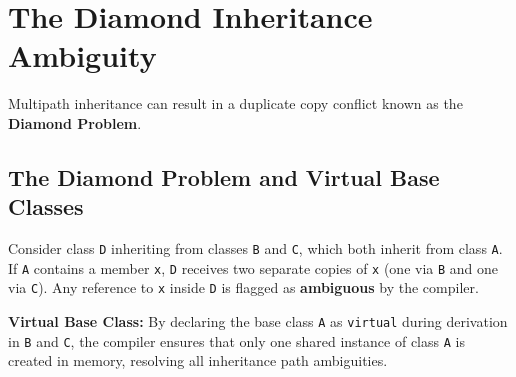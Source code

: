 \documentclass[12pt,a4paper]{article}
\begin{document}
\section{The Diamond Inheritance Ambiguity}

Multipath inheritance can result in a duplicate copy conflict known as the \textbf{Diamond Problem}.

\subsection{The Diamond Problem and Virtual Base Classes}
Consider class \texttt{D} inheriting from classes \texttt{B} and \texttt{C}, which both inherit from class \texttt{A}.
If \texttt{A} contains a member \texttt{x}, \texttt{D} receives two separate copies of \texttt{x} (one via \texttt{B} and one via \texttt{C}). Any reference to \texttt{x} inside \texttt{D} is flagged as \textbf{ambiguous} by the compiler.
\begin{tcolorbox}[defbox]
\textbf{Virtual Base Class:} By declaring the base class \texttt{A} as \texttt{virtual} during derivation in \texttt{B} and \texttt{C}, the compiler ensures that only one shared instance of class \texttt{A} is created in memory, resolving all inheritance path ambiguities.
\end{tcolorbox}
\end{document}
